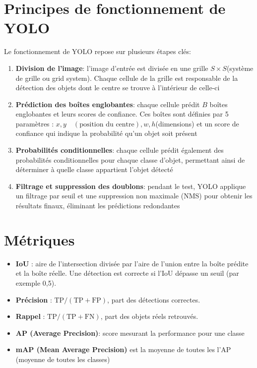 \documentclass[11pt,a4paper]{article}
\begin{document}
\section{Principes de fonctionnement de YOLO}
Le fonctionnement de YOLO repose sur plusieurs étapes clés:
\begin{enumerate}
    \item \textbf{Division de l'image}: l'image d'entrée est divisée en une grille $S \times S$(système de grille ou grid system). Chaque cellule de la grille est responsable de la détection des objets dont le centre se trouve à l'intérieur de celle-ci
    \item \textbf{Prédiction des boîtes englobantes}: chaque cellule prédit $B$ boîtes englobantes et leurs scores de confiance. Ces boîtes sont définies par 5 paramètres : $x,y \quad (\text{position du centre}),w,h$(dimensions) et un score de confiance qui indique la probabilité qu'un objet soit présent
    \item  \textbf{Probabilités conditionnelles}: chaque cellule prédit également des probabilités conditionnelles pour chaque classe d'objet, permettant ainsi de déterminer à quelle classe appartient l'objet détecté
    \item \textbf{Filtrage et suppression des doublons}: pendant le test, YOLO applique un filtrage par seuil et une suppression non maximale (NMS) pour obtenir les résultats finaux, éliminant les prédictions redondantes
\end{enumerate}

\section{Métriques}
\begin{itemize}
  \item \textbf{IoU} : aire de l'intersection divisée par l'aire de l'union
        entre la boîte prédite et la boîte réelle. Une détection est correcte
        si l'IoU dépasse un seuil (par exemple 0{,}5).
  \item \textbf{Précision} : $\mathrm{TP}/(\mathrm{TP}+\mathrm{FP})$, part
        des détections correctes.
  \item \textbf{Rappel} : $\mathrm{TP}/(\mathrm{TP}+\mathrm{FN})$, part des
        objets réels retrouvés.
  \item \textbf{AP (Average Precision)}: score mesurant la performance pour une classe
  \item \textbf{mAP (Mean Average Precision)} est la moyenne de toutes les l'AP (moyenne de toutes les classes)
\end{itemize}
\end{document}
